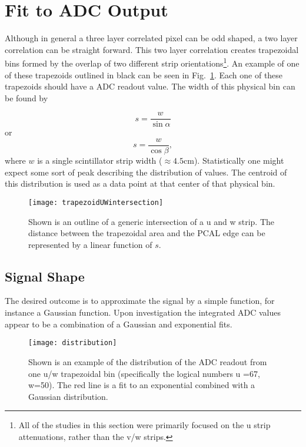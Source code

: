 \section{Fit to ADC Output}
Although in general a three layer correlated pixel can be odd shaped, a two layer correlation can be straight forward. 
This two layer correlation creates trapezoidal bins formed by the overlap of two different strip 
orientations\footnote{All of the studies in this section were primarily focused on the u strip attenuations, 
rather than the v/w strips.}. An example of one of these trapezoids outlined in black can be seen in Fig.~\ref{fig:stripwidth}. 
Each one of these trapezoids should have a ADC readout value. The width of this physical bin can be found by

\begin{equation}
    s = \frac{w}{\sin{\alpha}}
    \label{eq:s}
\end{equation}
or
\begin{equation}
    s = \frac{w}{\cos{\beta}},
\end{equation}
where $w$ is a single scintillator strip width ($\approx 4.5$cm).
Statistically one might expect some sort of peak describing the distribution of values. The centroid of this 
distribution is used as a data point at that center of that physical bin.

\begin{figure}[h]
\centering
\texttt{[image: trapezoidUWintersection]}%
\caption{Shown is an outline of a generic intersection of a u and w strip. The distance between the trapezoidal
 area and the PCAL edge can be represented by a linear function of $s$.}
\label{fig:stripwidth}
\end{figure}

\FloatBarrier
\subsection{Signal Shape}
The desired outcome is to approximate the signal by a simple function, for instance a Gaussian function.
Upon investigation the integrated ADC values appear to be a combination of a Gaussian and exponential fits.

\begin{figure}[h]
    \centering
    \texttt{[image: distribution]}
    \caption{Shown is an example of the distribution of the ADC readout from one u/w trapezoidal bin 
    (specifically the logical numbers u =67, w=50). The red line is a fit to an exponential combined with 
    a Gaussian distribution.}
    \label{fig:distribution}
\end{figure}

